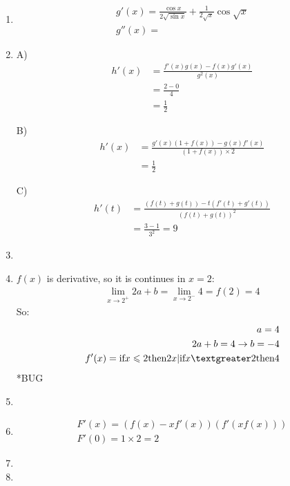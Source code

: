 \documentclass{article}
\begin{document}
\begin{enumerate}
		\item 
		\begin{align*}
			g'(x) = \frac{\cos x}{2\sqrt{\sin x}} + \frac{1}{2\sqrt{x}}\cos\sqrt{x} \\
			g''(x) = 
		\end{align*}
	
		\item A)
		\begin{align*}
			h'(x) &= \frac{f'(x)g(x) - f(x)g'(x)}{g^2(x)} \\
			&= \frac{2 - 0}{4} \\
			&= \frac{1}{2}
		\end{align*}
	
		B)
		\begin{align*}
			h'(x) &= \frac{g'(x)(1 + f(x)) - g(x)f'(x)}{(1 + f(x)) \times 2} \\
			&= \frac{1}{2}
		\end{align*}
	
		C)
		\begin{align*}
			h'(t) &= \frac{(f(t) + g(t)) - t(f'(t) + g'(t))}{(f(t) + g(t))^2} \\
			&= \frac{3 - 1}{3^2} = 9
		\end{align*}
	
		\item 
		
		\item $f(x)$ is derivative, so it is continues in $x = 2$:
		\begin{align*}
			\lim_{x \rightarrow 2^+} 2a + b = \lim_{x \rightarrow 2^-} 4 = f(2) = 4
		\end{align*}
		So:
		\begin{align*}
			a = 4 \\
			2a + b = 4 \rightarrow b = -4 \\
			f'(x) = \text{if} x \leqslant 2 \text{then} 2x | \text{if} x \textgreater 2 \text{then} 4	
		\end{align*}
		*BUG
		
		\item 
		
		\item 
		\begin{align*}
			F'(x) = (f(x) - xf'(x))(f'(xf(x))) \\
			F'(0) = 1 \times 2 = 2
		\end{align*}
	
		\item
		
		\item
		

\end{enumerate}
\end{document}
